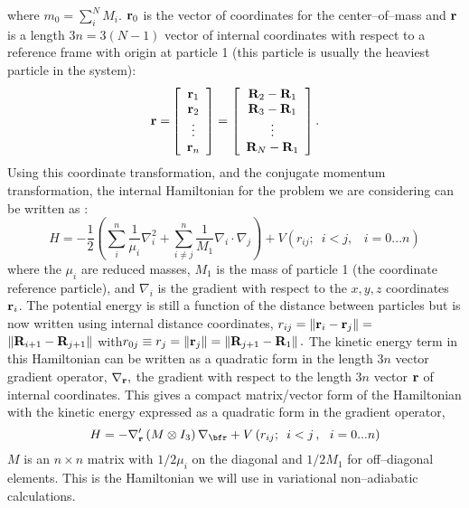 where $m_0=\sum_i^NM_i$. ${\bf r}_0$ is the vector of coordinates for the
center--of--mass and ${\bf r}$ is a length $3n=3\left( N-1\right) $ vector
of internal coordinates with respect to a reference frame with origin at
particle 1 (this particle is usually the heaviest particle in the system):
\begin{equation}
{\bf r=}\left[ 
\begin{array}{c}
{\bf r}_1 \\ 
{\bf r}_2 \\ 
\vdots  \\ 
{\bf r}_n
\end{array}
\right] =\left[ 
\begin{array}{c}
{\bf R}_2-{\bf R}_1 \\ 
{\bf R}_3-{\bf R}_1 \\ 
\vdots  \\ 
{\bf R}_N-{\bf R}_1
\end{array}
\right] .  \label{rdef}
\end{equation}
Using this coordinate transformation, and the conjugate momentum
transformation, the internal Hamiltonian for the problem 
we are considering
can be written as \cite{Kinghorn93,Kinghorn95b}: 
\begin{equation}
H=-\frac 12\left( \sum_i^n\frac 1{\mu _i}\nabla _i^2+\sum_{i\neq j}^n\frac
1{M_1}\nabla _i\cdot \nabla _j\right) +V\left(
r_{ij};\,\,\,i<j,\,\,\,\,\,i=0...n\right)   \label{intham1}
\end{equation}
where the $\mu _i$ are reduced masses, $M_1$ is the mass of particle 1 (the
coordinate reference particle), and $\nabla _i$ is the gradient with respect
to the $x,y,z$ coordinates ${\bf r}_i$. The potential energy is still a
function of the distance between particles but is now written using internal
distance coordinates, $r_{ij}=\left\| {\bf r}_i-{\bf r}_j\right\| =$ $%
\left\| {\bf R}_{i+1}-{\bf R}_{j+1}\right\| \,\,$with\thinspace $%
r_{0j}\equiv r_j=\left\| {\bf r}_j\right\| =\left\| {\bf R}_{j+1}-%
{\bf R}_1\right\| .$ The kinetic energy term in this Hamiltonian can be
written as a quadratic form in the length $3n$ vector gradient operator, $%
\nabla _{{\bf r}},$ the gradient with respect to the length $3n$ vector $%
{\bf r}$ of internal coordinates. This gives a compact matrix/vector form
of the Hamiltonian with the kinetic energy expressed as a quadratic form in
the gradient operator, 
\begin{equation}
H=-\nabla _{{\bf r}}^{\prime }\left( M\otimes I_3\right) \nabla _{{\bf%
r}}+V\left( r_{ij};\,\,\,i<j\,,\,\,\,\,i=0...n\right)   \label{ham}
\end{equation}
$M$ is an $n\times n$ matrix with $1/2\mu _i$ on the diagonal and $1/2M_1$
for off--diagonal elements. This is the Hamiltonian we 
will use in variational non--adiabatic calculations.



